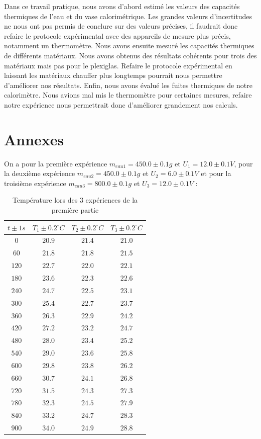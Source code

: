 \documentclass[12pt]{article}
\begin{document}
Dans ce travail pratique, nous avons d'abord estimé les valeurs des capacités thermiques de l'eau et du vase calorimétrique. Les grandes valeurs d'incertitudes ne nous ont pas permis de conclure sur des valeurs précises, il faudrait donc refaire le protocole expérimental avec des appareils de mesure plus précis, notamment un thermomètre. Nous avons ensuite mesuré les capacités thermiques de différents matériaux. Nous avons obtenus des résultats cohérents pour trois des matériaux mais pas pour le plexiglas. Refaire le protocole expérimental en laissant les matériaux chauffer plus longtemps pourrait nous permettre d'améliorer nos résultats. Enfin, nous avons évalué les fuites thermiques de notre calorimètre. Nous avions mal mis le thermomètre pour certaines mesures, refaire notre expérience nous permettrait donc d'améliorer grandement nos calculs. 

\newpage
\section*{Annexes}


On a pour la première expérience  $m_{eau1}=450.0\pm 0.1g$ et $U_1=12.0\pm 0.1V$, pour la deuxième expérience $m_{eau2}=450.0\pm 0.1g$ et $U_2=6.0\pm 0.1V$ et pour la troisième expérience  $m_{eau3}=800.0\pm 0.1g$ et $U_3=12.0\pm 0.1V$ :



\begin{table}[h!]
	\begin{center}
		\begin{tabular}{|c|c|c|c|}
		\hline
		$t\pm 1 s$ & $T_1 \pm 0.2^{\circ}C$ & $T_2 \pm 0.2^{\circ}C$ & $T_3 \pm 0.2^{\circ}C$ \\
		\hline
		$0$ & $20.9$ & $21.4$  & $21.0$\\
		$60$ & $21.8$ & $21.8$ & $21.5$\\
		$120$ & $22.7$ & $22.0$  & $22.1$\\
		$180$ & $23.6$ & $22.3$  & $22.6$\\
		$240$ & $24.7$ & $22.5$  & $23.1$\\
		$300$ & $25.4$ & $22.7$  & $23.7$\\
		$360$ & $26.3$ & $22.9$  & $24.2$\\
		$420$ & $27.2$ & $23.2$  & $24.7$\\
		$480$ & $28.0$ & $23.4$  & $25.2$\\
		$540$ & $29.0$ & $23.6$  & $25.8$\\
		$600$ & $29.8$ & $23.8$  & $26.2$\\
		$660$ & $30.7$ & $24.1$  & $26.8$\\
		$720$ & $31.5$ & $24.3$  & $27.3$\\
		$780$ & $32.3$ & $24.5$  & $27.9$\\
		$840$ & $33.2$ & $24.7$  & $28.3$\\
		$900$ & $34.0$ & $24.9$  & $28.8$\\
		\hline
		\end{tabular}
	\end{center}
	\caption{Température lors des 3 expériences de la première partie}
\end{table}
\end{document}
